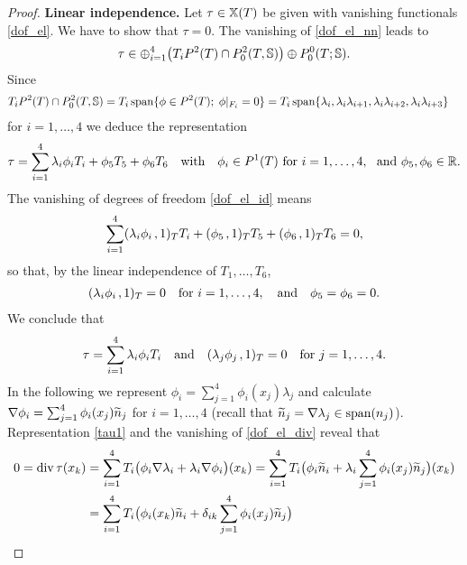 \documentclass[11pt]{article}
\begin{document}
\begin{proof}
{\bf Linear independence.}
Let $\tau\in\mathbb{X}(T)$ be given with vanishing functionals \eqref{dof_el}.
We have to show that $\tau=0$.
The vanishing of \eqref{dof_el_nn} leads to
\[
   \tau\in \oplus_{i=1}^4 \bigr(T_iP^2(T)\cap P^2_0(T,\mathbb{S})\bigr)\oplus P^0_0(T;\mathbb{S}).
\]
Since
\begin{align*}
   &T_iP^2(T)\cap P^2_0(T,\mathbb{S})
   = T_i\,\mathrm{span}\{\phi\in P^2(T);\; \phi|_{F_i}=0\}
   = T_i\,\mathrm{span}\{\lambda_i, \lambda_i\lambda_{i+1}, \lambda_i\lambda_{i+2},
                       \lambda_i\lambda_{i+3}\}
\end{align*}
for $i=1,\ldots,4$ we deduce the representation
\begin{align*}
   \tau=\sum_{i=1}^4 \lambda_i\phi_i T_i+\phi_5T_5+\phi_6T_6\quad\text{with}\quad
   \phi_i\in P^1(T) \text{ for } i=1,\ldots,4,\ \text{ and } \phi_5,\phi_6\in\mathbb{R}.
\end{align*}
The vanishing of degrees of freedom \eqref{dof_el_id} means
\[
   \sum_{i=1}^4 (\lambda_i\phi_i\hspace*{.5mm},1)_T T_i
             +(\phi_5\hspace*{.5mm},1)_T T_5+(\phi_6\hspace*{.5mm},1)_T T_6=0,
\]
so that, by the linear independence of $T_1,\ldots,T_6$,
\begin{align*}
  (\lambda_i\phi_i\hspace*{.5mm},1)_T=0\quad \text{for } i=1,\ldots,4,\quad
  \text{and}\quad \phi_5=\phi_6=0.
\end{align*}
We conclude that
\begin{align} \label{tau1}
   \tau=\sum_{i=1}^4 \lambda_i\phi_i T_i
   \quad\text{and}\quad (\lambda_j\phi_j\hspace*{.5mm},1)_T=0\quad \text{for}\ j=1,\ldots,4.
\end{align}
In the following we represent $\phi_i=\sum_{j=1}^4 \phi_i(x_j) \lambda_j$ and
calculate
\(
   \nabla\phi_i=\sum_{j=1}^4 \phi_i(x_j)\widetilde n_j
\)
for $i=1,\ldots,4$ (recall that $\widetilde n_j=\nabla\lambda_j\in\mathrm{span}(n_j)$).
Representation \eqref{tau1} and the vanishing of \eqref{dof_el_div} reveal that
\begin{align} \label{sys}
   0=\div\tau(x_k) &= \sum_{i=1}^4 T_i\bigl(\phi_i\grad\lambda_i + \lambda_i\grad\phi_i\bigr)(x_k)
   =
   \sum_{i=1}^4 T_i\bigl(\phi_i\wtilde n_i
                       + \lambda_i\sum_{j=1}^4 \phi_i(x_j)\wtilde n_j\bigr)(x_k)\nonumber\\
   &=
   \sum_{i=1}^4 T_i\bigl(\phi_i(x_k)\wtilde n_i
                       + \delta_{ik}\sum_{j=1}^4 \phi_i(x_j)\wtilde n_j\bigr)

\end{align}
\end{proof}
\end{document}
